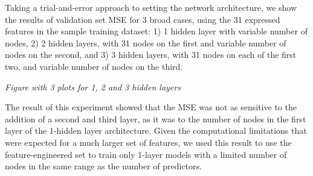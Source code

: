 \documentclass[11pt]{article}
\begin{document}
\begin{enumerate}
\begin{enumerate}
Taking a trial-and-error approach to setting the network architecture, we show the results of validation set MSE for 3 broad cases, using the 31 expressed features in the sample training dataset: 1) 1 hidden layer with variable number of nodes, 2) 2 hidden layers, with 31 nodes on the first and variable number of nodes on the second, and 3) 3 hidden layers, with 31 nodes on each of the first two, and variable number of nodes on the third.

\emph{Figure with 3 plots for 1, 2 and 3 hidden layers}

The result of this experiment showed that the MSE was not as sensitive to the addition of a second and third layer, as it was to the number of nodes in the first layer of the 1-hidden layer architecture. Given the computational limitations that were expected for a much larger set of features, we used this result to use the feature-engineered set to train only 1-layer models with a limited number of nodes in the same range as the number of predictors.


\end{enumerate}

\end{enumerate}
\end{document}
